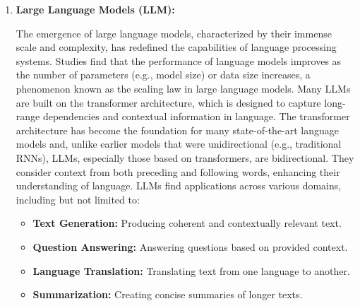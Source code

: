 \begin{enumerate}
{		      ELMo~\footnote{Embeddings from Language Models}~\cite{peters2018deep} was one of the first PLMs, which used a bidirectional LSTM to generate word embeddings instead of learning fixed word representations.
		      \textcite{devlin2019bert} introduced BERT (Bidirectional Encoder Representations from Transformers), which is a transformer-based model that is pre-trained on a large corpus of text and then fine-tuned on specific tasks.
		      BERT was a significant advancement in the field of natural language processing, as it demonstrated the potential of pre-trained language models to achieve state-of-the-art performance on a wide range of tasks.
		      These studies introduced the \textit{"pre-training and fine-tuning"} paradigm, which has become a standard practice in the development of language models and inspired great number of models, such as GPT-2~\cite{radford2019language}), GPT-3 (\textcite{brown2020language}), T5 (\textcite{raffel2023exploring}, and many others.
	      }
	\item \textbf{Large Language Models (LLM):} {The emergence of large language models, characterized by their immense scale and complexity, has redefined the capabilities of language processing systems.
		      Studies find that the performance of language models improves as the number of parameters (e.g., model size) or data size increases, a phenomenon known as the scaling law in large language models.
		      Many LLMs are built on the transformer architecture, which is designed to capture long-range dependencies and contextual information in language.
		      The transformer architecture has become the foundation for many state-of-the-art language models and, unlike earlier models that were unidirectional (e.g., traditional RNNs), LLMs, especially those based on transformers, are bidirectional. They consider context from both preceding and following words, enhancing their understanding of language.
		      LLMs find applications across various domains, including but not limited to:
		      \begin{itemize}
			      \item \textbf{Text Generation:} Producing coherent and contextually relevant text.
			      \item \textbf{Question Answering:} Answering questions based on provided context.
			      \item \textbf{Language Translation:} Translating text from one language to another.
			      \item \textbf{Summarization:} Creating concise summaries of longer texts.

\end{itemize}}
\end{enumerate}
